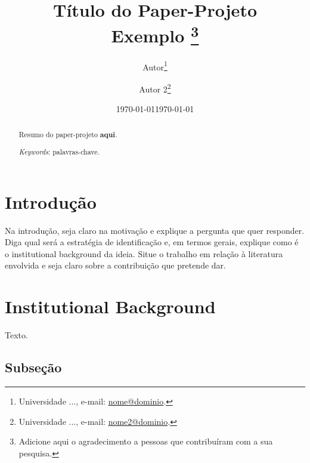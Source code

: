 \documentclass[letterpaper,12pt]{article}
\begin{document}

\title{Título do Paper-Projeto \\ Exemplo}
\makeatletter\let\Title\@title\makeatother

\title{\Large \textbf{\Title}%
\thanks{Adicione aqui o agradecimento a pessoas que contribuíram com a sua pesquisa.}}

\author{\large Autor\thanks{Universidade ..., e-mail: 
\href{mailto:nome@dominio}{nome@dominio}.} \and Autor 2\thanks{Universidade ..., e-mail: \href{mailto:nome2@dominio}{nome2@dominio}.}}
\date{\normalsize \today}
\date{\today}

\maketitle


\begin{abstract}
Resumo do paper-projeto \textbf{aqui}.
\medskip

\medskip

\noindent \textit{Keywords}: palavras-chave.
\end{abstract}

\doublespacing

\setlength\abovedisplayskip{5pt}
\setlength\belowdisplayskip{5pt}

\thispagestyle{empty}\clearpage

\section{Introdução}

Na introdução, seja claro na motivação e explique a pergunta que quer responder. Diga qual será a estratégia de identificação e, em termos gerais, explique como é o institutional background da ideia. Situe o trabalho em relação à literatura envolvida e seja claro sobre a contribuição que pretende dar.


\section{Institutional Background}\label{inst}

Texto.

\subsection{Subseção}
\end{document}
